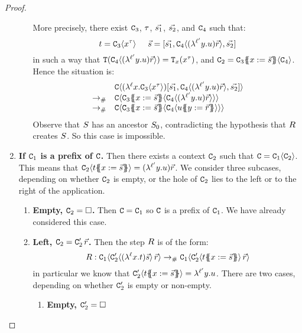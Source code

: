 \begin{proof}
\begin{enumerate}
\begin{enumerate}
    More precisely,
    there exist $\mathtt{C}_3$, $\tau$, $\vec{s_1}$, $\vec{s_2}$, and $\mathtt{C}_4$
    such that:
    \[
      t = \mathtt{C}_3\langle x^{\tau}\rangle
      \hspace{.5cm}
      \vec{s} = [\vec{s_1},\mathtt{C}_4\langle (\lambda^{\ell'} y. u)\vec{r} \rangle,\vec{s_2}]
    \]
    in such a way that $\mathtt{T}(\mathtt{C}_4\langle (\lambda^{\ell'} y. u)\vec{r} \rangle) = \mathtt{T}_{x}(x^{\tau})$,
    and $\mathtt{C}_2 = \mathtt{C}_3\{\!\!\{x := \vec{s}\}\!\!\}\langle\mathtt{C}_4\rangle$.
    Hence the situation is:
    \[
      \begin{array}{rl}
              & \conof{(\lamp{\lab}{\var}{\con_3\of{\var^{\typ}}})[\ls{\tmtwo_1},\con_4\of{ (\lamp{\labtwo}{\vartwo}{\tmthree})\ls{\tmfour} },\ls{\tmtwo_2}]} \\
      \todist & \conof{\con_3\sub{\var}{\ls{\tmtwo}}\of{\con_4\of{(\lamp{\labtwo}{\vartwo}{\tmthree})\ls{\tmfour}}}} \\
      \todist & \conof{\con_3\sub{\var}{\ls{\tmtwo}}\of{\con_4\of{ \tmthree\sub{\vartwo}{\ls{\tmfour}} }}}
      \end{array}
    \]
    Observe that $S$ has an ancestor $S_0$, contradicting the hypothesis that $R$ creates $S$.
    So this case is impossible.
  \end{enumerate}
\item {\bf If $\mathtt{C}_1$ is a prefix of $\mathtt{C}$.}
  Then there exists a context $\mathtt{C}_2$ such that $\mathtt{C} = \mathtt{C}_1\langle\mathtt{C}_2\rangle$.
  This means that $\mathtt{C}_2\langle t\{\!\!\{x := \vec{s}\}\!\!\}\rangle = (\lambda^{\ell'} y. u)\vec{r}$.
  We consider three subcases, depending on whether $\mathtt{C}_2$ is empty,
  or the hole of $\mathtt{C}_2$ lies to the left or to the right of the application.
  \begin{enumerate}
  \item {\bf Empty, $\mathtt{C}_2 = \Box$.}
    Then $\mathtt{C} = \mathtt{C}_1$ so $\mathtt{C}$ is a prefix of $\mathtt{C}_1$. We have already considered this case.
  \item {\bf Left, $\mathtt{C}_2 = \mathtt{C}'_2\,\vec{r}$.}
    Then the step $R$ is of the form:
    \[
      R :
      \mathtt{C}_1\langle\mathtt{C}'_2\langle(\lambda^{\ell} x. t)\vec{s}\rangle\,\vec{r}\rangle
      \mathrel{\to_{\mathtt{\#}}}
      \mathtt{C}_1\langle\mathtt{C}'_2\langle t\{\!\!\{x := \vec{s}\}\!\!\}\rangle\,\vec{r}\rangle
    \]
    in particular we know that $\mathtt{C}'_2\langle t\{\!\!\{x := \vec{s}\}\!\!\}\rangle = \lambda^{\ell'} y. u$.
    There are two cases, depending on whether $\mathtt{C}'_2$ is empty or non-empty.
    \begin{enumerate}
    \item {\bf Empty, $\mathtt{C}'_2 = \Box$}

\end{enumerate}
\end{enumerate}
\end{enumerate}
\end{proof}
